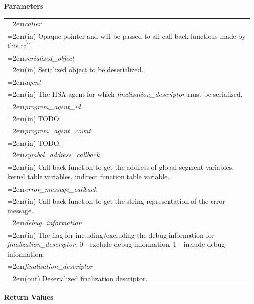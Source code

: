\documentclass[final]{book}
\newcommand{\hsaarg}[1]{\textit{#1}}
\begin{document}
\noindent\textbf{Parameters}\\[-6mm]
\noindent\begin{longtable}{@{}>{\hangindent=2em}p{\textwidth}}
\hsaarg{caller}\\\hspace{2em}(in) Opaque pointer and will be passed to all call back functions made by this call.\\[2mm]
\hsaarg{serialized_object}\\\hspace{2em}(in) Serialized object to be deserialized.\\[2mm]
\hsaarg{agent}\\\hspace{2em}(in) The HSA agent for which \textit{finalization_descriptor} must be serialized.\\[2mm]
\hsaarg{program_agent_id}\\\hspace{2em}(in) TODO.\\[2mm]
\hsaarg{program_agent_count}\\\hspace{2em}(in) TODO.\\[2mm]
\hsaarg{symbol_address_callback}\\\hspace{2em}(in) Call back function to get the address of global segment variables, kernel table variables, indirect function table variable.\\[2mm]
\hsaarg{error_message_callback}\\\hspace{2em}(in) Call back function to get the string representation of the error message.\\[2mm]
\hsaarg{debug_information}\\\hspace{2em}(in) The flag for including/excluding the debug information for \textit{finalization_descriptor}. 0 - exclude debug information, 1 - include debug information.\\[2mm]
\hsaarg{finalization_descriptor}\\\hspace{2em}(out) Deserialized finalization descriptor.
\end{longtable}
\vspace{-5mm}\noindent\textbf{Return Values}\\[-6mm]
\end{document}
